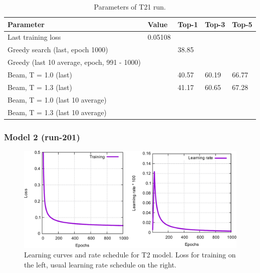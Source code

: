 \documentclass{article}
\begin{document}
\begin{table}[h!]
\caption{Parameters of T21 run.}
  \centering
  \begin{tabular}{p{8.2cm}p{1.5cm}p{1.5cm}p{1.5cm}p{1.5cm}}
    \toprule
    Parameter & Value & Top-1 & Top-3 & Top-5 \\
    \midrule
    Last training loss & 0.05108 & & & \\
    \midrule
    Greedy search (last, epoch 1000) & & 38.85 & & \\
    Greedy (last 10 average, epoch, 991 - 1000) & &  & & \\
    \midrule
    Beam, T = 1.0 (last) & & 40.57 &60.19  & 66.77 \\
    Beam, T = 1.3 (last) & & 41.17 & 60.65 &  67.28 \\ 
    \midrule
    Beam, T = 1.0 (last 10 average) & &  &  &  \\
    Beam, T = 1.3 (last 10 average) & &  &  &  \\ 
    \bottomrule
  \end{tabular}
  \label{tbl:t11}

\end{table} 

\newpage
 \subsubsection{Model 2 (run-201)}
 
\begin{figure}[h!]
  \centering
  \includegraphics[width = 16.5cm]{images/t2-2.pdf}
  \caption{Learning curves and rate schedule for T2 model. Loss for training on the left, usual learning rate schedule on the right.}
  \label{fig:t21}
\end{figure}
\end{document}
